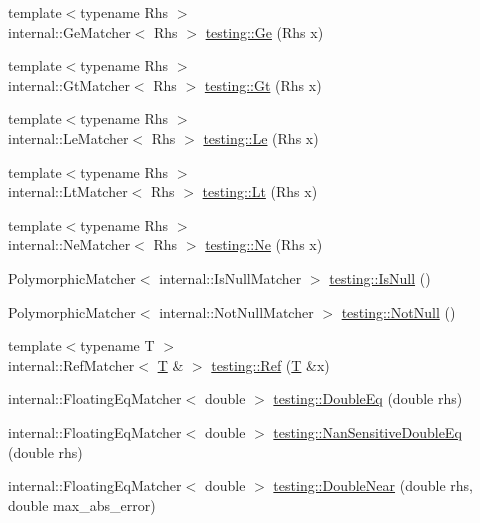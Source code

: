 \begin{DoxyCompactItemize}
\item 
{\footnotesize template$<$typename Rhs $>$ }\\internal\+::\+Ge\+Matcher$<$ Rhs $>$ \hyperlink{namespacetesting_a42bb19b42d7830b972973a103d5e00f2}{testing\+::\+Ge} (Rhs x)
\item 
{\footnotesize template$<$typename Rhs $>$ }\\internal\+::\+Gt\+Matcher$<$ Rhs $>$ \hyperlink{namespacetesting_a493fc1bafd7b3945ba06ace80e74b0d5}{testing\+::\+Gt} (Rhs x)
\item 
{\footnotesize template$<$typename Rhs $>$ }\\internal\+::\+Le\+Matcher$<$ Rhs $>$ \hyperlink{namespacetesting_a2e33596921b80a7fdaff3f62bf18a478}{testing\+::\+Le} (Rhs x)
\item 
{\footnotesize template$<$typename Rhs $>$ }\\internal\+::\+Lt\+Matcher$<$ Rhs $>$ \hyperlink{namespacetesting_ad621459957a8bcdd3c256b7940ecbf99}{testing\+::\+Lt} (Rhs x)
\item 
{\footnotesize template$<$typename Rhs $>$ }\\internal\+::\+Ne\+Matcher$<$ Rhs $>$ \hyperlink{namespacetesting_afe42d41d5171234cb9da5da27faeb7e8}{testing\+::\+Ne} (Rhs x)
\item 
Polymorphic\+Matcher$<$ internal\+::\+Is\+Null\+Matcher $>$ \hyperlink{namespacetesting_a56ffb1a169c14ce585fc5bed32add2db}{testing\+::\+Is\+Null} ()
\item 
Polymorphic\+Matcher$<$ internal\+::\+Not\+Null\+Matcher $>$ \hyperlink{namespacetesting_a39d1f92b53b8b2a0b6db6a22ac146416}{testing\+::\+Not\+Null} ()
\item 
{\footnotesize template$<$typename T $>$ }\\internal\+::\+Ref\+Matcher$<$ \hyperlink{functions__7_8js_adf1f3edb9115acb0a1e04209b7a9937b}{T} \& $>$ \hyperlink{namespacetesting_a0a4a364121ea3fa656a112f1c2e6b7a4}{testing\+::\+Ref} (\hyperlink{functions__7_8js_adf1f3edb9115acb0a1e04209b7a9937b}{T} \&x)
\item 
internal\+::\+Floating\+Eq\+Matcher$<$ double $>$ \hyperlink{namespacetesting_a1f49f9d97f03bfa4db26888f03486a9f}{testing\+::\+Double\+Eq} (double rhs)
\item 
internal\+::\+Floating\+Eq\+Matcher$<$ double $>$ \hyperlink{namespacetesting_aa83ee35256fd90033f615ef640245525}{testing\+::\+Nan\+Sensitive\+Double\+Eq} (double rhs)
\item 
internal\+::\+Floating\+Eq\+Matcher$<$ double $>$ \hyperlink{namespacetesting_aaee08ecb6815ef8398bbcb4e56d56d44}{testing\+::\+Double\+Near} (double rhs, double max\+\_\+abs\+\_\+error)

\end{DoxyCompactItemize}

